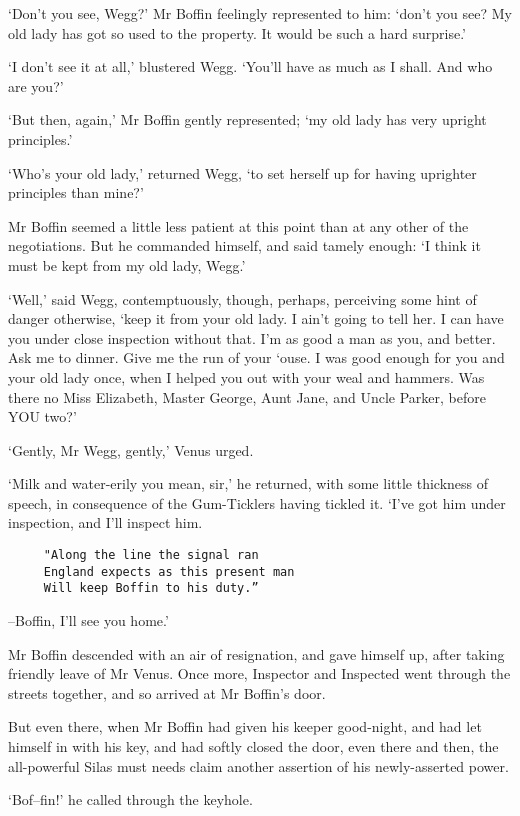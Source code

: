 ‘Don’t you see, Wegg?’ Mr Boffin feelingly represented to him: ‘don’t
you see? My old lady has got so used to the property. It would be such a
hard surprise.’

‘I don’t see it at all,’ blustered Wegg. ‘You’ll have as much as I
shall. And who are you?’

‘But then, again,’ Mr Boffin gently represented; ‘my old lady has very
upright principles.’

‘Who’s your old lady,’ returned Wegg, ‘to set herself up for having
uprighter principles than mine?’

Mr Boffin seemed a little less patient at this point than at any other
of the negotiations. But he commanded himself, and said tamely enough:
‘I think it must be kept from my old lady, Wegg.’

‘Well,’ said Wegg, contemptuously, though, perhaps, perceiving some hint
of danger otherwise, ‘keep it from your old lady. I ain’t going to tell
her. I can have you under close inspection without that. I’m as good a
man as you, and better. Ask me to dinner. Give me the run of your ‘ouse.
I was good enough for you and your old lady once, when I helped you out
with your weal and hammers. Was there no Miss Elizabeth, Master George,
Aunt Jane, and Uncle Parker, before YOU two?’

‘Gently, Mr Wegg, gently,’ Venus urged.

‘Milk and water-erily you mean, sir,’ he returned, with some little
thickness of speech, in consequence of the Gum-Ticklers having tickled
it. ‘I’ve got him under inspection, and I’ll inspect him.

\begin{verbatim}
     "Along the line the signal ran
     England expects as this present man
     Will keep Boffin to his duty.”
\end{verbatim}

--Boffin, I’ll see you home.’

Mr Boffin descended with an air of resignation, and gave himself up,
after taking friendly leave of Mr Venus. Once more, Inspector and
Inspected went through the streets together, and so arrived at Mr
Boffin’s door.

But even there, when Mr Boffin had given his keeper good-night, and had
let himself in with his key, and had softly closed the door, even there
and then, the all-powerful Silas must needs claim another assertion of
his newly-asserted power.

‘Bof--fin!’ he called through the keyhole.


